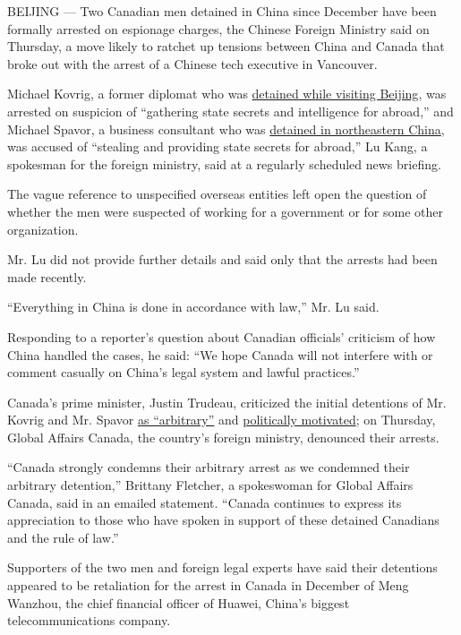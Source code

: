BEIJING --- Two Canadian men detained in China since December have been
formally arrested on espionage charges, the Chinese Foreign Ministry
said on Thursday, a move likely to ratchet up tensions between China and
Canada that broke out with the arrest of a Chinese tech executive in
Vancouver.

Michael Kovrig, a former diplomat who was
\href{https://www.nytimes.com/2018/12/11/world/asia/michael-kovrig-china-canada.html}{detained
while visiting Beijing}, was arrested on suspicion of ``gathering state
secrets and intelligence for abroad,'' and Michael Spavor, a business
consultant who was
\href{https://www.nytimes.com/2018/12/12/world/asia/michael-spavor-canadian-detained-china.html}{detained
in northeastern China}, was accused of ``stealing and providing state
secrets for abroad,'' Lu Kang, a spokesman for the foreign ministry,
said at a regularly scheduled news briefing.

The vague reference to unspecified overseas entities left open the
question of whether the men were suspected of working for a government
or for some other organization.

Mr. Lu did not provide further details and said only that the arrests
had been made recently.

``Everything in China is done in accordance with law,'' Mr. Lu said.

Responding to a reporter's question about Canadian officials' criticism
of how China handled the cases, he said: ``We hope Canada will not
interfere with or comment casually on China's legal system and lawful
practices.''

Canada's prime minister, Justin Trudeau, criticized the initial
detentions of Mr. Kovrig and Mr. Spavor
\href{https://www.nytimes.com/2018/12/12/world/asia/michael-spavor-canadian-detained-china.html}{as
``arbitrary''} and
\href{https://www.citynews1130.com/2019/01/10/trudeau-detention-canadians-politically-motivated/}{politically
motivated}; on Thursday, Global Affairs Canada, the country's foreign
ministry, denounced their arrests.

``Canada strongly condemns their arbitrary arrest as we condemned their
arbitrary detention,'' Brittany Fletcher, a spokeswoman for Global
Affairs Canada, said in an emailed statement. ``Canada continues to
express its appreciation to those who have spoken in support of these
detained Canadians and the rule of law.''

Supporters of the two men and foreign legal experts have said their
detentions appeared to be retaliation for the arrest in Canada in
December of Meng Wanzhou, the chief financial officer of Huawei, China's
biggest telecommunications company.

